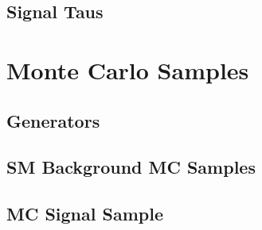 		\subsection{Signal Taus}




	\section{Monte Carlo Samples}

		\subsection{Generators}

		\subsection{SM Background MC Samples}

		\subsection{MC Signal Sample}



